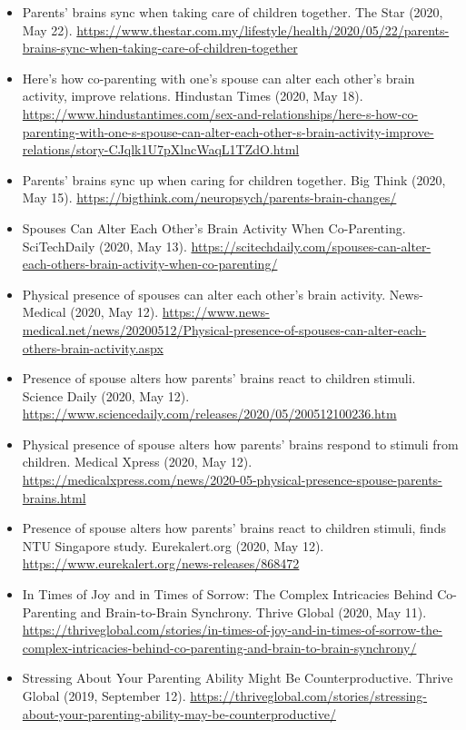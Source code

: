 \documentclass[10pt,a4paper]{altacv}
\begin{document}
\begin{fullwidth}
\begin{itemize}
			\item Parents’ brains sync when taking care of children together. The Star (2020, May 22). \url{https://www.thestar.com.my/lifestyle/health/2020/05/22/parents-brains-sync-when-taking-care-of-children-together}
			\item Here’s how co-parenting with one’s spouse can alter each other’s brain activity, improve relations. Hindustan Times (2020, May 18). \url{https://www.hindustantimes.com/sex-and-relationships/here-s-how-co-parenting-with-one-s-spouse-can-alter-each-other-s-brain-activity-improve-relations/story-CJqlk1U7pXlncWaqL1TZdO.html}
			\item Parents’ brains sync up when caring for children together. Big Think (2020, May 15). \url{https://bigthink.com/neuropsych/parents-brain-changes/}
			\item Spouses Can Alter Each Other’s Brain Activity When Co-Parenting. SciTechDaily (2020, May 13). \url{https://scitechdaily.com/spouses-can-alter-each-others-brain-activity-when-co-parenting/}
			\item Physical presence of spouses can alter each other's brain activity. News-Medical (2020, May 12). \url{https://www.news-medical.net/news/20200512/Physical-presence-of-spouses-can-alter-each-others-brain-activity.aspx}
			\item Presence of spouse alters how parents' brains react to children stimuli. Science Daily (2020, May 12). \url{https://www.sciencedaily.com/releases/2020/05/200512100236.htm}
			\item Physical presence of spouse alters how parents' brains respond to stimuli from children. Medical Xpress (2020, May 12). \url{https://medicalxpress.com/news/2020-05-physical-presence-spouse-parents-brains.html}
			\item Presence of spouse alters how parents' brains react to children stimuli, finds NTU Singapore study. Eurekalert.org (2020, May 12). \url{https://www.eurekalert.org/news-releases/868472}
			\item In Times of Joy and in Times of Sorrow: The Complex Intricacies Behind Co-Parenting and Brain-to-Brain Synchrony. Thrive Global (2020, May 11). \url{https://thriveglobal.com/stories/in-times-of-joy-and-in-times-of-sorrow-the-complex-intricacies-behind-co-parenting-and-brain-to-brain-synchrony/}
			\item Stressing About Your Parenting Ability Might Be Counterproductive. Thrive Global (2019, September 12). \url{https://thriveglobal.com/stories/stressing-about-your-parenting-ability-may-be-counterproductive/}

\end{itemize}
\end{fullwidth}
\end{document}
